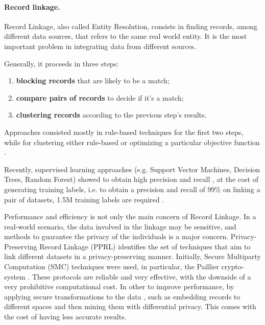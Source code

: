 \documentclass[12pt]{article}
\begin{document}
\paragraph{Record linkage.}
Record Linkage, also called Entity Resolution, consists in finding records, among different data sources, that refers to the same real world entity. 
It is the most important problem in integrating data from different sources. 

Generally, it proceeds in three steps: 
\begin{enumerate}
   \item \textbf{blocking records} that are likely to be a match;
   \item \textbf{compare pairs of records} to decide if it's a match;
   \item \textbf{clustering records} according to the previous step's results.
\end{enumerate}

Approaches consisted mostly in rule-based techniques \cite*{recordLinkTheory, Gal2011} for the first two steps, while for clustering either 
rule-based or optimizing a particular objective function \cite*{Hass2009}. 

Recently, supervised learning approaches (e.g. Support Vector Machines, Decision Trees, Random Forest) showed to obtain high precision and recall \cite*{Das2017}, 
at the cost of generating training labels, i.e. to obtain a precision and recall of 99\% on linking a pair of datasets, 1.5M training labels are required \cite*{Dong2018}.

Performance and efficiency is not only the main concern of Record Linkage. In a real-world scenario, the data involved in the linkage may be sensitive, and methods to guarantee 
the privacy of the individuals is a major concern. Privacy-Preserving Record Linkage (PPRL) identifies the set of techniques that aim to link different datasets in 
a privacy-preserving manner.
Initially, Secure Multiparty Computation (SMC) techniques were used, in particular, the Paillier crypto-system \cite*{paillier1999public}. 
These protocols are reliable and very effective, with the downside of a very prohibitive computational cost. 
In other to improve performance, by applying secure transformations to the data \cite*{Bonomi2013}, such as embedding records to different spaces and then mining them with differential privacy.
This comes with the cost of having less accurate results. 
\end{document}
